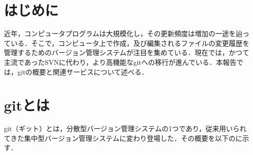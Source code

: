 \documentclass[a4paper,9pt,twocolumn]{jsarticle}
\begin{document}


\section{はじめに}
近年，コンピュータプログラムは大規模化し，その更新頻度は増加の一途を辿っている．そこで，コンピュータ上で作成，及び編集されるファイルの変更履歴を管理するためのバージョン管理システムが注目を集めている．現在では，かつて主流であったSVNに代わり，より高機能なgitへの移行が進んでいる．本報告では，gitの概要と関連サービスについて述べる．

\section{gitとは}
git（ギット）とは，分散型バージョン管理システムの1つであり，従来用いられてきた集中型バージョン管理システムに変わり登場した．その概要を以下のに示す．
\end{document}
